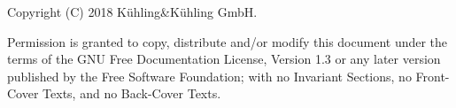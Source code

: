 \begin{center}
Copyright (C) 2018 Kühling\&Kühling GmbH.

Permission is granted to copy, distribute and/or modify this document
under the terms of the GNU Free Documentation License, Version 1.3
or any later version published by the Free Software Foundation;
with no Invariant Sections, no Front-Cover Texts, and no Back-Cover Texts.
\end{center}